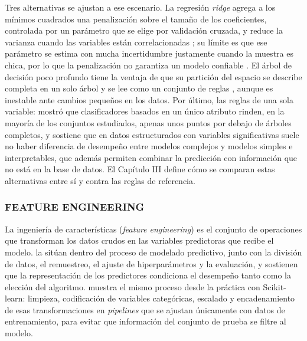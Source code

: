 Tres alternativas se ajustan a ese escenario. La regresión \textit{ridge} agrega a los mínimos cuadrados una penalización sobre el tamaño de los coeficientes, controlada por un parámetro que se elige por validación cruzada, y reduce la varianza cuando las variables están correlacionadas \parencite{HoerlKennard1970, Hastie2009}; su límite es que ese parámetro se estima con mucha incertidumbre justamente cuando la muestra es chica, por lo que la penalización no garantiza un modelo confiable \parencite{Riley2021Penalization}. El árbol de decisión poco profundo tiene la ventaja de que su partición del espacio se describe completa en un solo árbol y se lee como un conjunto de reglas \parencite{Hastie2009}, aunque es inestable ante cambios pequeños en los datos. Por último, las reglas de una sola variable: \textcite{Holte1993} mostró que clasificadores basados en un único atributo rinden, en la mayoría de los conjuntos estudiados, apenas unos puntos por debajo de árboles completos, y \textcite{Rudin2019} sostiene que en datos estructurados con variables significativas suele no haber diferencia de desempeño entre modelos complejos y modelos simples e interpretables, que además permiten combinar la predicción con información que no está en la base de datos. El Capítulo III define cómo se comparan estas alternativas entre sí y contra las reglas de referencia.

\subsubsection{FEATURE ENGINEERING}

La ingeniería de características (\textit{feature engineering}) es el conjunto de operaciones que transforman los datos crudos en las variables predictoras que recibe el modelo. \textcite{Kuhn2019} la sitúan dentro del proceso de modelado predictivo, junto con la división de datos, el remuestreo, el ajuste de hiperparámetros y la evaluación, y sostienen que la representación de los predictores condiciona el desempeño tanto como la elección del algoritmo. \textcite{Geron2022} muestra el mismo proceso desde la práctica con Scikit-learn: limpieza, codificación de variables categóricas, escalado y encadenamiento de esas transformaciones en \textit{pipelines} que se ajustan únicamente con datos de entrenamiento, para evitar que información del conjunto de prueba se filtre al modelo.

